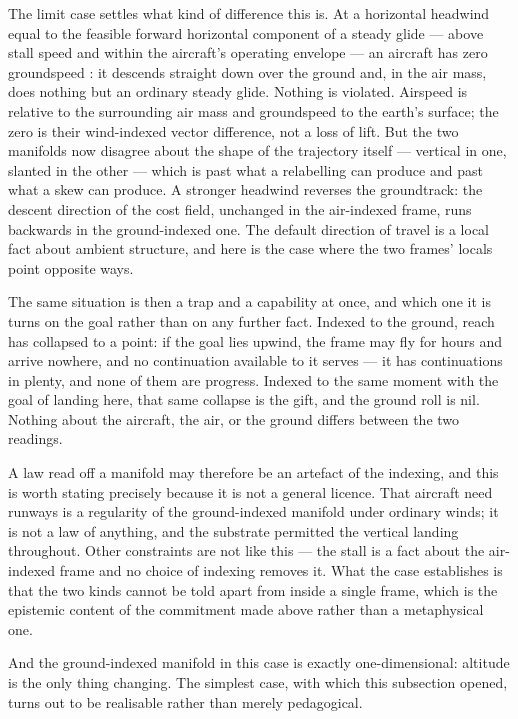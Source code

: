 \documentclass[11pt,a4paper]{article}
\theoremstyle{remark}
\begin{document}
The limit case settles what kind of difference this is. At a horizontal headwind equal to the
feasible forward horizontal component of a steady glide --- above stall speed and within the
aircraft's operating envelope --- an aircraft has zero groundspeed \citep{faa2026pcg}: it descends
straight down over the ground and, in the air mass, does nothing but an ordinary steady glide. Nothing
is violated. Airspeed is relative to the surrounding air mass and groundspeed to the earth's surface;
the zero is their wind-indexed vector difference, not a loss of lift. But the two manifolds now
disagree about the shape of the trajectory itself --- vertical in one, slanted in the other --- which
is past what a relabelling can produce and past what a skew can produce. A stronger headwind reverses
the groundtrack: the descent direction of the cost field, unchanged in the air-indexed frame, runs
backwards in the ground-indexed one. The default direction of travel is a local fact about ambient
structure, and here is the case where the two frames' locals point opposite ways.

The same situation is then a trap and a capability at once, and which one it is turns on the goal
rather than on any further fact. Indexed to the ground, reach has collapsed to a point: if the goal
lies upwind, the frame may fly for hours and arrive nowhere, and no continuation available to it
serves --- it has continuations in plenty, and none of them are progress. Indexed to the same moment
with the goal of landing here, that same collapse is the gift, and the ground roll is nil. Nothing
about the aircraft, the air, or the ground differs between the two readings.

A law read off a manifold may therefore be an artefact of the indexing, and this is worth stating
precisely because it is not a general licence. That aircraft need runways is a regularity of the
ground-indexed manifold under ordinary winds; it is not a law of anything, and the substrate
permitted the vertical landing throughout. Other constraints are not like this --- the stall is a
fact about the air-indexed frame and no choice of indexing removes it. What the case establishes is
that the two kinds cannot be told apart from inside a single frame, which is the epistemic content of
the commitment made above rather than a metaphysical one.

And the ground-indexed manifold in this case is exactly one-dimensional: altitude is the only thing
changing. The simplest case, with which this subsection opened, turns out to be realisable rather
than merely pedagogical.
\end{document}
